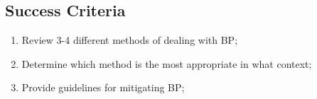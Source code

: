 \subsection{Success Criteria}
\begin{enumerate}
    \item Review 3-4 different methods of dealing with BP;
    \item Determine which method is the most appropriate in what context;
    \item Provide guidelines for mitigating BP;
\end{enumerate}

